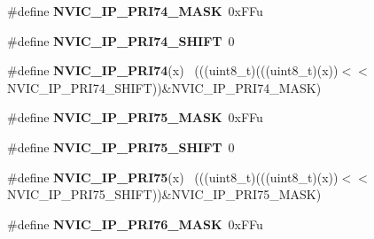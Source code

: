 \begin{DoxyCompactItemize}
\item 
\hypertarget{group___n_v_i_c___register___masks_ga9f7ed55cfb2b087267126a3871404c8f}{}\#define {\bfseries N\+V\+I\+C\+\_\+\+I\+P\+\_\+\+P\+R\+I74\+\_\+\+M\+A\+S\+K}~0x\+F\+Fu\label{group___n_v_i_c___register___masks_ga9f7ed55cfb2b087267126a3871404c8f}

\item 
\hypertarget{group___n_v_i_c___register___masks_gade1aa7259f845e0441c7f2d9e78f3de2}{}\#define {\bfseries N\+V\+I\+C\+\_\+\+I\+P\+\_\+\+P\+R\+I74\+\_\+\+S\+H\+I\+F\+T}~0\label{group___n_v_i_c___register___masks_gade1aa7259f845e0441c7f2d9e78f3de2}

\item 
\hypertarget{group___n_v_i_c___register___masks_gabc3b69855ca6e9681acf624226b1a5ab}{}\#define {\bfseries N\+V\+I\+C\+\_\+\+I\+P\+\_\+\+P\+R\+I74}(x)                                              ~(((uint8\+\_\+t)(((uint8\+\_\+t)(x))$<$$<$N\+V\+I\+C\+\_\+\+I\+P\+\_\+\+P\+R\+I74\+\_\+\+S\+H\+I\+F\+T))\&N\+V\+I\+C\+\_\+\+I\+P\+\_\+\+P\+R\+I74\+\_\+\+M\+A\+S\+K)\label{group___n_v_i_c___register___masks_gabc3b69855ca6e9681acf624226b1a5ab}

\item 
\hypertarget{group___n_v_i_c___register___masks_ga33b53383778c4f79267e4f5e085bbb26}{}\#define {\bfseries N\+V\+I\+C\+\_\+\+I\+P\+\_\+\+P\+R\+I75\+\_\+\+M\+A\+S\+K}~0x\+F\+Fu\label{group___n_v_i_c___register___masks_ga33b53383778c4f79267e4f5e085bbb26}

\item 
\hypertarget{group___n_v_i_c___register___masks_gaa52b9bab0c5d773678a0d428820284c8}{}\#define {\bfseries N\+V\+I\+C\+\_\+\+I\+P\+\_\+\+P\+R\+I75\+\_\+\+S\+H\+I\+F\+T}~0\label{group___n_v_i_c___register___masks_gaa52b9bab0c5d773678a0d428820284c8}

\item 
\hypertarget{group___n_v_i_c___register___masks_ga3dcceb8f2f7bd635df6e7deac126769f}{}\#define {\bfseries N\+V\+I\+C\+\_\+\+I\+P\+\_\+\+P\+R\+I75}(x)                                              ~(((uint8\+\_\+t)(((uint8\+\_\+t)(x))$<$$<$N\+V\+I\+C\+\_\+\+I\+P\+\_\+\+P\+R\+I75\+\_\+\+S\+H\+I\+F\+T))\&N\+V\+I\+C\+\_\+\+I\+P\+\_\+\+P\+R\+I75\+\_\+\+M\+A\+S\+K)\label{group___n_v_i_c___register___masks_ga3dcceb8f2f7bd635df6e7deac126769f}

\item 
\hypertarget{group___n_v_i_c___register___masks_gae38b82857a9f23d9af7a5b8a78d6a7b6}{}\#define {\bfseries N\+V\+I\+C\+\_\+\+I\+P\+\_\+\+P\+R\+I76\+\_\+\+M\+A\+S\+K}~0x\+F\+Fu\label{group___n_v_i_c___register___masks_gae38b82857a9f23d9af7a5b8a78d6a7b6}


\end{DoxyCompactItemize}
